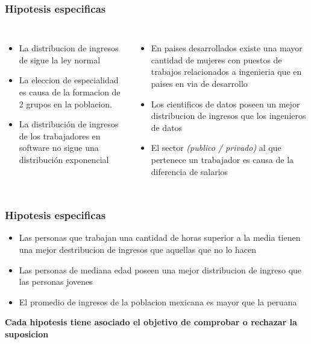 \documentclass{beamer}
\begin{document}
\begin{frame}
\frametitle{Hipotesis especificas}

\begin{columns}

  \begin{itemize}
      \item La distribucion de ingresos de  sigue
        la ley normal
      \item La eleccion de especialidad es causa de la formacion de 2 grupos
        en la poblacion.
      \item La distribución de ingresos de los trabajadores en software
        no sigue una distribución exponencial
  \end{itemize}


  \begin{itemize}
      \item En paises desarrollados existe una mayor cantidad
        de mujeres con puestos de trabajos relacionados a ingenieria que en paises en via
        de desarrollo
      \item Los cientificos de datos poseen un mejor distribucion de ingresos
        que los ingenieros de datos
      \item El sector \textit{(publico / privado)} al que pertenece un trabajador
        es causa de la diferencia de salarios
  \end{itemize}
\end{columns}
\end{frame}


\begin{frame}
\frametitle{Hipotesis especificas}
  \begin{itemize}
      \item Las personas que trabajan una cantidad de horas superior a
        la media tienen una mejor destribucion de ingresos que aquellas
        que no lo hacen
      \item Las personas de mediana edad poseen una mejor distribucion
        de ingreso que las personas jovenes
      \item El promedio de ingresos de la poblacion mexicana es mayor
        que la peruana
  \end{itemize}

  \textbf{Cada hipotesis tiene asociado el objetivo de comprobar
  o rechazar la suposicion}

\end{frame}
\end{document}
